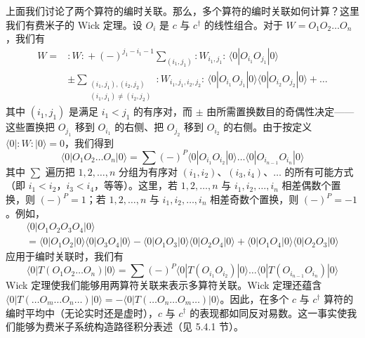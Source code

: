 上面我们讨论了两个算符的编时关联。那么，多个算符的编时关联如何计算？这里我们有费米子的 Wick 定理。设 $O_{i}$ 是 $c$ 与 $c^{\dagger}$ 的线性组合。对于 $W = O_{1}O_{2}\dots O_{n}$，我们有
\begin{align*}
W = {}& {:W:} + (-)^{j_{1}-i_{1}-1}\sum_{(i_{1},j_{1})}{:W_{i_{1},j_{1}}:}\,\langle 0|O_{i_{1}}O_{j_{1}}|0\rangle\\
& \pm \sum_{\substack{(i_{1},j_{1}),(i_{2},j_{2})\\(i_{1},j_{1})\neq(i_{2},j_{2})}}{:W_{i_{1},j_{1},i_{2},j_{2}}:}\,\langle 0|O_{i_{1}}O_{j_{1}}|0\rangle\langle 0|O_{i_{2}}O_{j_{2}}|0\rangle + \dots \tag{4.2.11}
\end{align*}
其中 $(i_{1}, j_{1})$ 是满足 $i_{1} < j_{1}$ 的有序对，而 $\pm$ 由所需置换数目的奇偶性决定——这些置换把 $O_{j_{1}}$ 移到 $O_{i_{1}}$ 的右侧、把 $O_{j_{2}}$ 移到 $O_{i_{2}}$ 的右侧。由于按定义 $\langle 0|{:W:}|0\rangle = 0$，我们得到
\begin{equation*}
\langle 0|O_{1}O_{2}\dots O_{n}|0\rangle = \sum(-)^{P}\langle 0|O_{i_{1}}O_{i_{2}}|0\rangle\dots\langle 0|O_{i_{n-1}}O_{i_{n}}|0\rangle
\end{equation*}
其中 $\sum$ 遍历把 $1, 2, \dots, n$ 分组为有序对 $(i_{1}, i_{2})$、$(i_{3}, i_{4})$、$\dots$ 的所有可能方式（即 $i_{1} < i_{2}$，$i_{3} < i_{4}$，等等）。这里，若 $1, 2, \dots, n$ 与 $i_{1}, i_{2}, \dots, i_{n}$ 相差偶数个置换，则 $(-)^{P} = 1$；若 $1, 2, \dots, n$ 与 $i_{1}, i_{2}, \dots, i_{n}$ 相差奇数个置换，则 $(-)^{P} = -1$。例如，
\begin{gather*}
\langle 0|O_{1}O_{2}O_{3}O_{4}|0\rangle\\
= \langle 0|O_{1}O_{2}|0\rangle\langle 0|O_{3}O_{4}|0\rangle - \langle 0|O_{1}O_{3}|0\rangle\langle 0|O_{2}O_{4}|0\rangle + \langle 0|O_{1}O_{4}|0\rangle\langle 0|O_{2}O_{3}|0\rangle
\end{gather*}
应用于编时关联时，我们有
\begin{equation*}
\langle 0|T(O_{1}O_{2}\dots O_{n})|0\rangle = \sum(-)^{P}\langle 0|T(O_{i_{1}}O_{i_{2}})|0\rangle\dots\langle 0|T(O_{i_{n-1}}O_{i_{n}})|0\rangle
\end{equation*}
Wick 定理使我们能够用两算符关联来表示多算符关联。Wick 定理还蕴含 $\langle 0|T(\dots O_{m}\dots O_{n}\dots)|0\rangle \allowbreak= -\langle 0|T(\dots O_{n}\dots O_{m}\dots)|0\rangle$。因此，在多个 $c$ 与 $c^{\dagger}$ 算符的编时平均中（无论实时还是虚时），$c$ 与 $c^{\dagger}$ 的表现都如同反对易数。这一事实使我们能够为费米子系统构造路径积分表述（见 5.4.1 节）。


